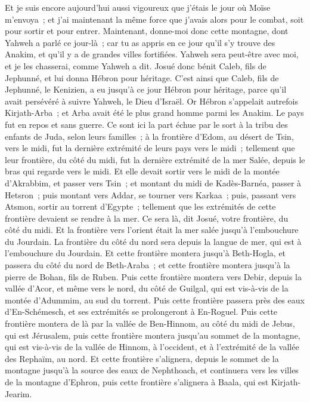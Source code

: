 \begin{multicols}{2}
Et je suis encore aujourd'hui aussi vigoureux que j'étais le jour où Moïse m'envoya~; et j'ai maintenant la même force que j'avais alors pour le combat, soit pour sortir et pour entrer.
Maintenant, donne-moi donc cette montagne, dont Yahweh a parlé ce jour-là~; car tu as appris en ce jour qu'il s'y trouve des Anakim, et qu'il y a de grandes villes fortifiées. Yahweh sera peut-être avec moi, et je les chasserai, comme Yahweh a dit.
Josué donc bénit Caleb, fils de Jephunné, et lui donna Hébron pour héritage.
C'est ainsi que Caleb, fils de Jephunné, le Kenizien, a eu jusqu'à ce jour Hébron pour héritage, parce qu'il avait persévéré à suivre Yahweh, le Dieu d'Israël.
Or Hébron s'appelait autrefois Kirjath-Arba~; et Arba avait été le plus grand homme parmi les Anakim. Le pays fut en repos et sans guerre.
\VerseOne{} Ce sont ici la part échue par le sort à la tribu des enfants de Juda, selon leurs familles~; à la frontière d'Edom, au désert de Tsin, vers le midi, fut la dernière extrémité de leurs pays vers le midi~;
tellement que leur frontière, du côté du midi, fut la dernière extrémité de la mer Salée, depuis le bras qui regarde vers le midi. 
Et elle devait sortir vers le midi de la montée d'Akrabbim, et passer vers Tsin~; et montant du midi de Kadès-Barnéa, passer à Hetsron~; puis montant vers Addar, se tourner vers Karkaa~; 
puis, passant vers Atsmon, sortir au torrent d'Egypte~; tellement que les extrémités de cette frontière devaient se rendre à la mer. Ce sera là, dit Josué, votre frontière, du côté du midi.
Et la frontière vers l'orient était la mer salée jusqu'à l'embouchure du Jourdain. La frontière du côté du nord sera depuis la langue de mer, qui est à l'embouchure du Jourdain.
Et cette frontière montera jusqu'à Beth-Hogla, et passera du côté du nord de Beth-Araba~; et cette frontière montera jusqu'à la pierre de Bohan, fils de Ruben.
Puis cette frontière montera vers Debir, depuis la vallée d'Acor, et même vers le nord, du côté de Guilgal, qui est vis-à-vis de la montée d'Adummim, au sud du torrent. Puis cette frontière passera près des eaux d'En-Schémesch, et ses extrémités se prolongeront à En-Roguel.
Puis cette frontière montera de là par la vallée de Ben-Hinnom, au côté du midi de Jebus, qui est Jérusalem, puis cette frontière montera jusqu'au sommet de la montagne, qui est vis-à-vis de la vallée de Hinnom, à l'occident, et à l'extrémité de la vallée des Rephaïm, au nord.
Et cette frontière s'alignera, depuis le sommet de la montagne jusqu'à la source des eaux de Nephthoach, et continuera vers les villes de la montagne d'Ephron, puis cette frontière s'alignera à Baala, qui est Kirjath-Jearim.

\end{multicols}
